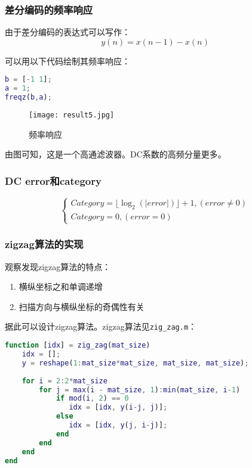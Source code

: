\documentclass[a4paper]{article}
\begin{document}
\subsubsection{差分编码的频率响应}
\par 由于差分编码的表达式可以写作：
\begin{equation}
    y(n) = x(n-1) - x(n)
\end{equation}
\par 可以用以下代码绘制其频率响应：

\begin{lstlisting}[language=matlab, caption=差分编码频响]
b = [-1 1];
a = 1;
freqz(b,a);
\end{lstlisting}

\begin{figure}[ht]
     \centering
     \texttt{[image: result5.jpg]}
     \caption{频率响应}
    \label{fig:result 5}
\end{figure}

\par 由图可知，这是一个高通滤波器。DC系数的高频分量更多。

\subsubsection{DC error和category}
\begin{equation}
\begin{cases}
    Category = \lfloor \log_2( |error| )\rfloor + 1 , (error \neq 0) \\
    Category = 0 , (error = 0)
\end{cases}
\end{equation}

\subsubsection{zigzag算法的实现}
\par 观察发现zigzag算法的特点：
\begin{enumerate}
    \item 横纵坐标之和单调递增
    \item 扫描方向与横纵坐标的奇偶性有关
\end{enumerate}
\par 据此可以设计zigzag算法。zigzag算法见\lstinline{zig_zag.m}：
\begin{lstlisting}[language=matlab, caption=zigzag算法]
function [idx] = zig_zag(mat_size)
    idx = [];
    y = reshape(1:mat_size*mat_size, mat_size, mat_size);
    
    for i = 2:2*mat_size
        for j = max(i - mat_size, 1):min(mat_size, i-1)
            if mod(i, 2) == 0
               idx = [idx, y(i-j, j)];
            else
               idx = [idx, y(j, i-j)];
            end
        end
    end
end
\end{lstlisting}
\end{document}
